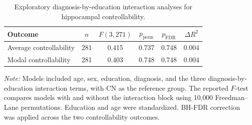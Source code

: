 \documentclass{article}
\begin{document}
\begin{table}[!htbp]
\centering
\caption{Exploratory diagnosis-by-education interaction analyses for hippocampal controllability.}
\label{tab:tableS3}
\footnotesize
\setlength{\tabcolsep}{4pt}
\begin{tabular}{@{}lccccc@{}}
\toprule
\textbf{Outcome} & \textbf{$n$} & \textbf{$F(3,271)$} & \textbf{$p_{\mathrm{perm}}$} & \textbf{$p_{\mathrm{FDR}}$} & \textbf{$\Delta R^2$}\\
\midrule
Average controllability & 281 & 0.415 & 0.737 & 0.748 & 0.004 \\
Modal controllability & 281 & 0.403 & 0.748 & 0.748 & 0.004 \\
\bottomrule
\end{tabular}

\vspace{1mm}
\footnotesize{\textit{Note:} Models included age, sex, education, diagnosis, and the three diagnosis-by-education interaction terms, with CN as the reference group. The reported \(F\)-test compares models with and without the interaction block using 10,000 Freedman--Lane permutations. Education and age were standardized. BH-FDR correction was applied across the two controllability outcomes.}

\end{table}
\end{document}
